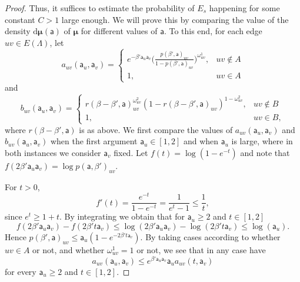 \documentclass[10pt,a4paper]{amsart}
\begin{document}
\begin{proof}
Thus, it suffices to estimate the probability of $E_s$ happening for some constant $C>1$ large enough. We will prove this by comparing the value of the density $\mathrm{d}\boldsymbol{\mu}(\mathsf{a})$ of $\boldsymbol{\mu}$ for different values of $\mathsf{a}$. To this end,
for each edge $uv \in E(\Lambda)$, let
\begin{equation}\label{eq: a definition}
a_{uv}(\mathsf{a}_u,\mathsf{a}_v)=
\begin{cases}
e^{-\beta' \mathsf{a}_u \mathsf{a}_v}\Big(\frac{p(\beta',\mathsf{a})_{uv}}{1-p(\beta',\mathsf{a})_{uv}}\Big)^{\omega^1_{uv}}, & uv\not\in A\\
1, & uv\in A
\end{cases}
\end{equation}
and
\begin{equation}\label{eq: b definition}
b_{uv}(\mathsf{a}_u,\mathsf{a}_v)=
\begin{cases}
r(\beta-\beta',\mathsf{a})^{\omega^2_{uv}}_{uv}\left(1-r(\beta-\beta',\mathsf{a})_{uv}\right)^{1-\omega^2_{uv}}, & uv\not\in B\\
1, & uv\in B,
\end{cases}
\end{equation}
where $r(\beta-\beta',\mathsf{a})$ is as above.  We first compare the values of $a_{uv}(\mathsf{a}_u,\mathsf{a}_v)$ and $b_{uv}(\mathsf{a}_u,\mathsf{a}_v)$ when the first argument $\mathsf{a}_u\in [1,2]$ and when $\mathsf{a}_u$ is large, where in both instances we consider $\mathsf a_v$ fixed. Let $f(t)=\log(1-e^{-t})$ and note that $f(2\beta'\mathsf a_u \mathsf a_v)=\log p(\mathsf a, \beta')_{uv}$.


For $t>0$,
\begin{equation}
f'(t)=\frac{e^{-t}}{1-e^{-t}}=\frac{1}{e^t-1}\leq \frac{1}{t},
\end{equation}
since $e^t\geq 1+t$. By integrating we obtain that for $\mathsf{a}_u\geq 2$ and $t\in [1,2]$
\begin{equation}
f(2\beta' \mathsf{a}_u \mathsf{a}_v)-f(2\beta' t \mathsf{a}_v)\leq \log(2\beta' \mathsf{a}_u \mathsf{a}_v)-\log(2\beta' t \mathsf{a}_v)\leq \log(\mathsf{a}_u).
\end{equation}
Hence $p(\beta',\mathsf a)_{uv} \leq \mathsf a_u(1- e^{-2\beta' t \mathsf a_v})$.
By taking cases according to whether $uv \in A$ or not, and whether $\omega^1_{uv}=1$ or not, we see that in any case have
\begin{equation}\label{eq: a estimate}
a_{uv}(\mathsf{a}_u,\mathsf{a}_v)\leq e^{\beta'\mathsf{a}_u \mathsf{a}_v} \mathsf{a}_u a_{uv}(t,\mathsf{a}_v)   
\end{equation} 
for every $\mathsf{a}_u\geq 2$ and $t\in [1,2]$.



\end{proof}
\end{document}
